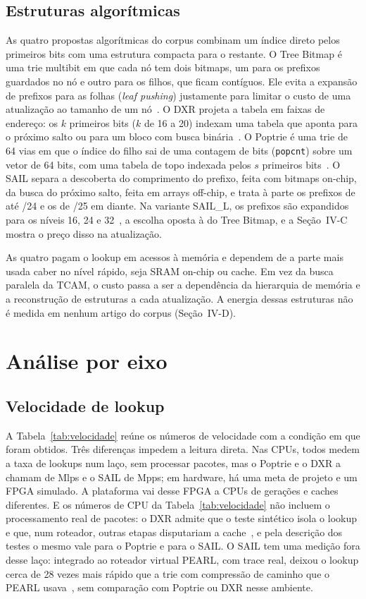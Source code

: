 \documentclass[conference,a4paper]{IEEEtran}
\begin{document}
\subsection{Estruturas algorítmicas}
As quatro propostas algorítmicas do corpus combinam um índice direto pelos primeiros bits com uma estrutura compacta para
o restante. O Tree Bitmap é uma trie multibit em que cada nó tem dois bitmaps, um para os prefixos guardados no nó e outro
para os filhos, que ficam contíguos. Ele evita a expansão de prefixos para as folhas (\textit{leaf pushing}) justamente
para limitar o custo de uma atualização ao tamanho de um nó~\cite[\S4]{eath04}. O DXR projeta a tabela em faixas de
endereço: os $k$ primeiros bits ($k$ de 16 a 20) indexam uma tabela que aponta para o próximo salto ou para um bloco com
busca binária~\cite[\S3.2]{zec12}. O Poptrie é uma trie de 64 vias em que o índice do filho sai de uma contagem de bits
(\texttt{popcnt}) sobre um vetor de 64 bits, com uma tabela de topo indexada pelos $s$ primeiros bits~\cite[\S3]{asai15}.
O SAIL separa a descoberta do comprimento do prefixo, feita com bitmaps on-chip, da busca do próximo salto, feita em
arrays off-chip, e trata à parte os prefixos de até /24 e os de /25 em diante. Na variante SAIL\_L, os prefixos são
expandidos para os níveis 16, 24 e 32~\cite[\S I-C, \S IV]{yang18}, a escolha oposta à do Tree Bitmap, e a
Seção~IV-C mostra o preço disso na atualização.

As quatro pagam o lookup em acessos à memória e dependem de a parte mais usada caber no nível rápido, seja SRAM on-chip
ou cache. Em vez da busca paralela da TCAM, o custo passa a ser a dependência da hierarquia de memória e a reconstrução de
estruturas a cada atualização. A energia dessas estruturas não é medida em nenhum artigo do corpus (Seção~IV-D).

\section{Análise por eixo}

\subsection{Velocidade de lookup}
A Tabela~\ref{tab:velocidade} reúne os números de velocidade com a condição em que foram obtidos. Três diferenças impedem a
leitura direta. Nas CPUs, todos medem a taxa de lookups num laço, sem processar pacotes, mas o Poptrie e o DXR a chamam de
Mlps e o SAIL de Mpps; em hardware, há uma meta de projeto e um FPGA simulado. A plataforma vai desse FPGA a CPUs de
gerações e caches diferentes. E os números de CPU da Tabela~\ref{tab:velocidade} não incluem o processamento real de
pacotes: o DXR admite que o teste sintético isola o lookup e que, num roteador, outras etapas disputariam a
cache~\cite[\S4.2]{zec12}, e pela descrição dos testes o mesmo vale para o Poptrie e para o SAIL. O SAIL tem uma medição
fora desse laço: integrado ao roteador virtual PEARL, com trace real, deixou o lookup cerca de 28 vezes mais rápido que a
trie com compressão de caminho que o PEARL usava~\cite[\S V-E]{yang18}, sem comparação com Poptrie ou DXR nesse ambiente.
\end{document}
